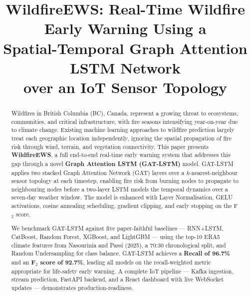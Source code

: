 \documentclass[conference]{IEEEtran}
\begin{document}
\title{\LARGE WildfireEWS: Real-Time Wildfire Early Warning Using a\\
Spatial-Temporal Graph Attention LSTM Network\\
over an IoT Sensor Topology}

\author{
}

\maketitle

\begin{abstract}
Wildfires in British Columbia (BC), Canada, represent a growing threat to
ecosystems, communities, and critical infrastructure, with fire seasons
intensifying year-on-year due to climate change. Existing machine learning
approaches to wildfire prediction largely treat each geographic location
independently, ignoring the spatial propagation of fire risk through wind,
terrain, and vegetation connectivity. This paper presents
\textbf{WildfireEWS}, a full end-to-end real-time early warning system that
addresses this gap through a novel \textbf{Graph Attention LSTM (GAT-LSTM)}
model. GAT-LSTM applies two stacked Graph Attention Network (GAT) layers over
a $k$-nearest-neighbour sensor topology at each timestep, enabling fire risk
from burning nodes to propagate to neighbouring nodes before a two-layer LSTM
models the temporal dynamics over a seven-day weather window. The model is
enhanced with Layer Normalisation, GELU activations, cosine annealing
scheduling, gradient clipping, and early stopping on the F$_2$ score.

We benchmark GAT-LSTM against five paper-faithful baselines — RNN+LSTM,
CatBoost, Random Forest, XGBoost, and LightGBM — using the top-10 ERA5 climate
features from Nasourinia and Passi (2025), a 70:30 chronological split, and
Random Undersampling for class balance. GAT-LSTM achieves a \textbf{Recall of
96.7\%} and an \textbf{F$_2$ score of 92.7\%}, leading all models on the
recall-weighted metric appropriate for life-safety early warning. A complete IoT
pipeline — Kafka ingestion, stream prediction, FastAPI backend, and a React
dashboard with live WebSocket updates — demonstrates production-readiness.
\end{abstract}
\end{document}
